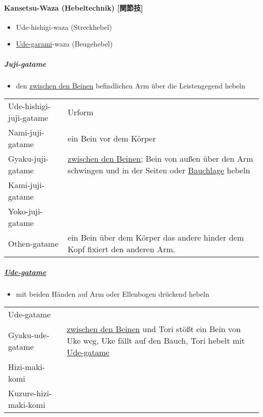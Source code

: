 \documentclass[justified, a4paper, notitlepage, captions=tableheading, nobib]{tufte-handout}
\begin{document}
\paragraph{Kansetsu-Waza (Hebeltechnik) [関節技] }
\label{sec:orgc05d08b}

\begin{itemize}
\item Ude-hishigi-waza (Streckhebel)
\item \hyperref[org17e995a]{Ude-garami}-waza (Beugehebel)
\end{itemize}

\subparagraph{Juji-gatame}
\label{sec:org6676a8f}

\begin{itemize}
\item den \hyperref[orgf285c69]{zwischen den Beinen} befindlichen Arm über die Leistengegend hebeln
\end{itemize}

\begin{center}
\begin{tabular}{ll}
\label{org8f0f04c}Ude-hishigi-juji-gatame & Urform\\
\label{orgced54df}Nami-juji-gatame & ein Bein vor dem Körper\\
\label{org8961fd8}Gyaku-juji-gatame & \hyperref[orgf285c69]{zwischen den Beinen}; Bein von außen über den Arm schwingen und in der Seiten oder \hyperref[orgfae504a]{Bauchlage} hebeln\\
\label{org2918f3e}Kami-juji-gatame & \\
\label{orgce76edd}Yoko-juji-gatame & \\
\label{org1c691eb}Othen-gatame & ein Bein über dem Körper das andere hinder dem Kopf fixiert den anderen Arm.\\
\end{tabular}
\end{center}

\subparagraph{\hyperref[org042d788]{Ude-gatame}}
\label{sec:org333c89f}

\begin{itemize}
\item mit beiden Händen auf Arm oder Ellenbogen drückend hebeln
\end{itemize}

\begin{center}
\begin{tabular}{ll}
\label{org042d788}Ude-gatame & \\
\label{org33e6d7e}Gyaku-ude-gatame & \hyperref[orgf285c69]{zwischen den Beinen} und Tori stößt ein Bein von Uke weg, Uke fällt auf den Bauch, Tori hebelt mit \hyperref[org042d788]{Ude-gatame}\\
\label{orgf1b66e8}Hizi-maki-komi & \\
\label{orgf39dddd}Kuzure-hizi-maki-komi & \\
\end{tabular}
\end{center}
\end{document}
